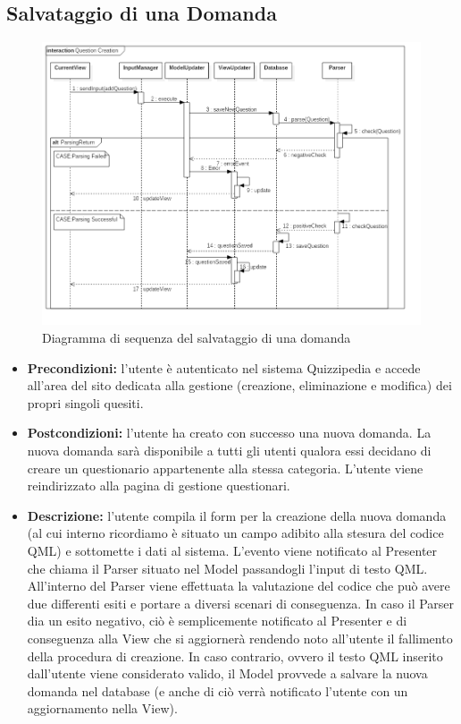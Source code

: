 \documentclass[a4paper,11pt]{article}
\begin{document}
	\subsection{Salvataggio di una Domanda}
	\begin{figure}[h!]
	\begin{center}
		\includegraphics[scale=0.5]{../images/QuestionSaving.png}
		\caption{Diagramma di sequenza del salvataggio di una domanda}
	\end{center}
	\end{figure}
	\begin{itemize}
	\item\textbf{Precondizioni:} l'utente è autenticato nel sistema Quizzipedia e accede all'area del sito dedicata alla gestione (creazione, eliminazione e modifica) dei propri singoli quesiti.\\
	\item\textbf{Postcondizioni:} l'utente ha creato con successo una nuova domanda. La nuova domanda sarà disponibile a tutti gli utenti qualora essi decidano di creare un questionario appartenente alla stessa categoria. L'utente viene reindirizzato alla pagina di gestione questionari.\\
	\item\textbf{Descrizione:} l'utente compila il form per la creazione della nuova domanda (al cui interno ricordiamo è situato un campo adibito alla stesura del codice QML) e sottomette i dati al sistema. L'evento viene notificato al Presenter che chiama il Parser situato nel Model passandogli l'input di testo QML. All'interno del Parser viene effettuata la valutazione del codice che può avere due differenti esiti e portare a diversi scenari di conseguenza. In caso il Parser dia un esito negativo, ciò è semplicemente notificato al Presenter e di conseguenza alla View che si aggiornerà rendendo noto all'utente il fallimento della procedura di creazione. In caso contrario, ovvero il testo QML inserito dall'utente viene considerato valido, il Model provvede a salvare la nuova domanda nel database (e anche di ciò verrà notificato l'utente con un aggiornamento nella View).\\
	\end{itemize}
	
\end{document}

